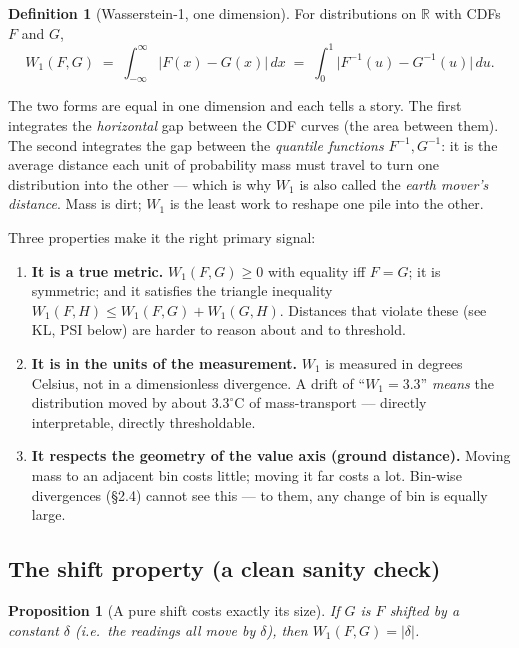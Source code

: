 \documentclass[11pt]{article}
\newtheorem{proposition}{Proposition}
\theoremstyle{definition}
\newtheorem{definition}{Definition}
\newcommand{\R}{\mathbb{R}}
\begin{document}
\begin{definition}[Wasserstein-1, one dimension]
For distributions on $\R$ with CDFs $F$ and $G$,
\begin{equation}
  W_1(F, G)
  \;=\; \int_{-\infty}^{\infty} \bigl| F(x) - G(x) \bigr|\, dx
  \;=\; \int_{0}^{1} \bigl| F^{-1}(u) - G^{-1}(u) \bigr|\, du .
\end{equation}
\end{definition}

The two forms are equal in one dimension and each tells a story. The first integrates the
\emph{horizontal} gap between the CDF curves (the area between them). The second integrates the gap
between the \emph{quantile functions} $F^{-1}, G^{-1}$: it is the average distance each unit of
probability mass must travel to turn one distribution into the other --- which is why $W_1$ is also
called the \emph{earth mover's distance}. Mass is dirt; $W_1$ is the least work to reshape one pile
into the other.

Three properties make it the right primary signal:

\begin{enumerate}[leftmargin=1.5em, itemsep=0.3em]
  \item \textbf{It is a true metric.} $W_1(F,G) \ge 0$ with equality iff $F = G$; it is symmetric;
        and it satisfies the triangle inequality $W_1(F,H) \le W_1(F,G) + W_1(G,H)$. Distances that
        violate these (see KL, PSI below) are harder to reason about and to threshold.
  \item \textbf{It is in the units of the measurement.} $W_1$ is measured in degrees Celsius, not in
        a dimensionless divergence. A drift of ``$W_1 = 3.3$'' \emph{means} the distribution moved
        by about $3.3^\circ$C of mass-transport --- directly interpretable, directly thresholdable.
  \item \textbf{It respects the geometry of the value axis (ground distance).} Moving mass to an
        adjacent bin costs little; moving it far costs a lot. Bin-wise divergences (\S2.4) cannot see
        this --- to them, any change of bin is equally large.
\end{enumerate}

\subsection{The shift property (a clean sanity check)}

\begin{proposition}[A pure shift costs exactly its size]
If $G$ is $F$ shifted by a constant $\delta$ (i.e.\ the readings all move by $\delta$), then
$W_1(F, G) = |\delta|$.
\end{proposition}
\end{document}
